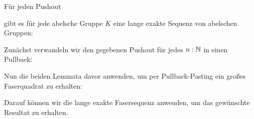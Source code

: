 \begin{theorem}
  Für jeden Pushout
  \begin{center}
  \end{center}
  gibt es für jede abelsche Gruppe $K$ eine lange exakte Sequenz von abelschen Gruppen:
  \begin{center}
  \end{center}
\end{theorem}
\begin{beweis}
  Zunächst verwandeln wir den gegebenen Pushout für jedes $n:\mathbb{N}$ in einen Pullback:
  \begin{center}
  \end{center}
  Nun die beiden Lemmata davor anwenden, um per Pullback-Pasting ein großes Faserquadrat zu erhalten:
  \begin{center}
  \end{center}
  Darauf können wir die lange exakte Fasersequenz anwenden, um das gewünschte Resultat zu erhalten.
\end{beweis}

